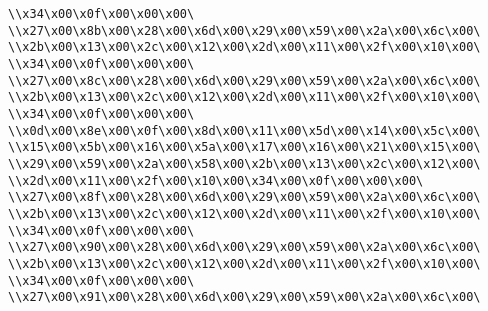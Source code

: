 \verb|\\x34\x00\x0f\x00\x00\x00\|\newline
\verb|\\x27\x00\x8b\x00\x28\x00\x6d\x00\x29\x00\x59\x00\x2a\x00\x6c\x00\|\newline
\verb|\\x2b\x00\x13\x00\x2c\x00\x12\x00\x2d\x00\x11\x00\x2f\x00\x10\x00\|\newline
\verb|\\x34\x00\x0f\x00\x00\x00\|\newline
\verb|\\x27\x00\x8c\x00\x28\x00\x6d\x00\x29\x00\x59\x00\x2a\x00\x6c\x00\|\newline
\verb|\\x2b\x00\x13\x00\x2c\x00\x12\x00\x2d\x00\x11\x00\x2f\x00\x10\x00\|\newline
\verb|\\x34\x00\x0f\x00\x00\x00\|\newline
\verb|\\x0d\x00\x8e\x00\x0f\x00\x8d\x00\x11\x00\x5d\x00\x14\x00\x5c\x00\|\newline
\verb|\\x15\x00\x5b\x00\x16\x00\x5a\x00\x17\x00\x16\x00\x21\x00\x15\x00\|\newline
\verb|\\x29\x00\x59\x00\x2a\x00\x58\x00\x2b\x00\x13\x00\x2c\x00\x12\x00\|\newline
\verb|\\x2d\x00\x11\x00\x2f\x00\x10\x00\x34\x00\x0f\x00\x00\x00\|\newline
\verb|\\x27\x00\x8f\x00\x28\x00\x6d\x00\x29\x00\x59\x00\x2a\x00\x6c\x00\|\newline
\verb|\\x2b\x00\x13\x00\x2c\x00\x12\x00\x2d\x00\x11\x00\x2f\x00\x10\x00\|\newline
\verb|\\x34\x00\x0f\x00\x00\x00\|\newline
\verb|\\x27\x00\x90\x00\x28\x00\x6d\x00\x29\x00\x59\x00\x2a\x00\x6c\x00\|\newline
\verb|\\x2b\x00\x13\x00\x2c\x00\x12\x00\x2d\x00\x11\x00\x2f\x00\x10\x00\|\newline
\verb|\\x34\x00\x0f\x00\x00\x00\|\newline
\verb|\\x27\x00\x91\x00\x28\x00\x6d\x00\x29\x00\x59\x00\x2a\x00\x6c\x00\|\newline
